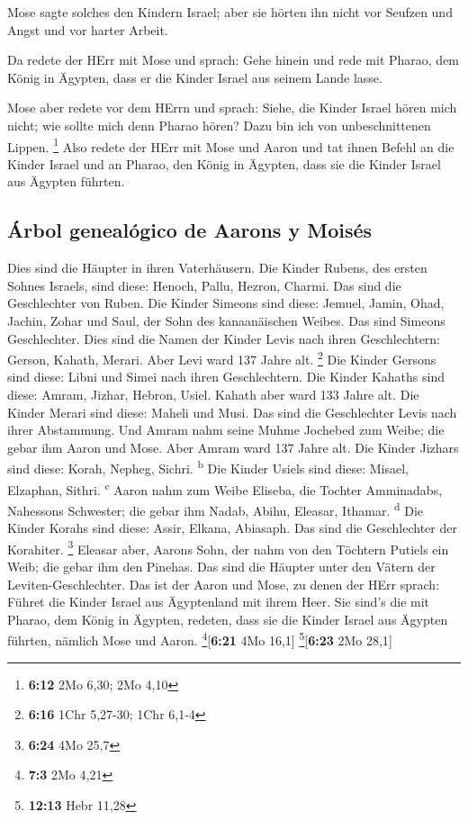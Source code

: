  Mose sagte solches den Kindern Israel; aber sie hörten
ihn nicht vor Seufzen und Angst und vor harter Arbeit.

 Da redete der HErr mit Mose und sprach: 
Gehe hinein und rede mit Pharao, dem König in Ägypten, dass er die
Kinder Israel aus seinem Lande lasse.

 Mose aber redete vor dem HErrn und sprach: Siehe, die
Kinder Israel hören mich nicht; wie sollte mich denn Pharao hören? Dazu
bin ich von unbeschnittenen Lippen. \footnote{\textbf{6:12} 2Mo 6,30;
  2Mo 4,10}  Also redete der HErr mit Mose und Aaron und
tat ihnen Befehl an die Kinder Israel und an Pharao, den König in
Ägypten, dass sie die Kinder Israel aus Ägypten führten.

\hypertarget{uxe1rbol-genealuxf3gico-de-aarons-y-moisuxe9s}{%
\subsection{Árbol genealógico de Aarons y
Moisés}\label{uxe1rbol-genealuxf3gico-de-aarons-y-moisuxe9s}}

 Dies sind die Häupter in ihren Vaterhäusern. Die Kinder
Rubens, des ersten Sohnes Israels, sind diese: Henoch, Pallu, Hezron,
Charmi. Das sind die Geschlechter von Ruben.  Die Kinder
Simeons sind diese: Jemuel, Jamin, Ohad, Jachin, Zohar und Saul, der
Sohn des kanaanäischen Weibes. Das sind Simeons Geschlechter.
 Dies sind die Namen der Kinder Levis nach ihren
Geschlechtern: Gerson, Kahath, Merari. Aber Levi ward 137 Jahre alt.
\footnote{\textbf{6:16} 1Chr 5,27-30; 1Chr 6,1-4}  Die
Kinder Gersons sind diese: Libni und Simei nach ihren Geschlechtern.
 Die Kinder Kahaths sind diese: Amram, Jizhar, Hebron,
Usiel. Kahath aber ward 133 Jahre alt.  Die Kinder Merari
sind diese: Maheli und Musi. Das sind die Geschlechter Levis nach ihrer
Abstammung.  Und Amram nahm seine Muhme Jochebed zum
Weibe; die gebar ihm Aaron und Mose. Aber Amram ward 137 Jahre alt.
 Die Kinder Jizhars sind diese: Korah, Nepheg, Sichri.
\textsuperscript{b}  Die Kinder Usiels sind diese:
Misael, Elzaphan, Sithri. \textsuperscript{c}  Aaron nahm
zum Weibe Eliseba, die Tochter Amminadabs, Nahessons Schwester; die
gebar ihm Nadab, Abihu, Eleasar, Ithamar. \textsuperscript{d}
 Die Kinder Korahs sind diese: Assir, Elkana, Abiasaph.
Das sind die Geschlechter der Korahiter. \footnote{\textbf{6:24} 4Mo
  25,7}  Eleasar aber, Aarons Sohn, der nahm von den
Töchtern Putiels ein Weib; die gebar ihm den Pinehas. Das sind die
Häupter unter den Vätern der Leviten-Geschlechter.  Das
ist der Aaron und Mose, zu denen der HErr sprach: Führet die Kinder
Israel aus Ägyptenland mit ihrem Heer.  Sie sind's die
mit Pharao, dem König in Ägypten, redeten, dass sie die Kinder Israel
aus Ägypten führten, nämlich Mose und Aaron. \footnote{\textbf{7:3} 2Mo
  4,21}{[}\textbf{6:21} 4Mo 16,1{]} \footnote{\textbf{12:13} Hebr 11,28}{[}\textbf{6:23}
2Mo 28,1{]}

